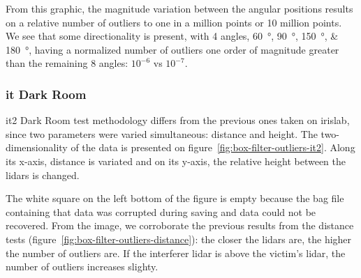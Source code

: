 From this graphic, the magnitude variation between the angular positions results on a relative number of outliers to one in a million points or 10 million points. We see that some directionality is present, with 4 angles, \SIlist[list-final-separator = {, }]{60; 90; 150; 180}{\degree}, having a normalized number of outliers one order of magnitude greater than the remaining 8 angles: $10^{-6}$ vs $10^{-7}$.




\subsubsection{\ac{it} Dark Room}
\ac{it}2 Dark Room test methodology differs from the previous ones taken on \ac{irislab}, since two parameters were varied simultaneous: distance and height. The two-dimensionality of the data is presented on figure~\ref{fig:box-filter-outliers-it2}. Along its x-axis, distance is variated and on its y-axis, the relative height between the \acp{lidar} is changed.

The white square on the left bottom of the figure is empty because the bag file containing that data was corrupted during saving and data could not be recovered. From the image, we corroborate the previous results from the distance tests (figure~\ref{fig:box-filter-outliers-distance}): the closer the \acp{lidar} are, the higher the number of outliers are. If the interferer \ac{lidar} is above the victim's \ac{lidar}, the number of outliers increases slighty.

